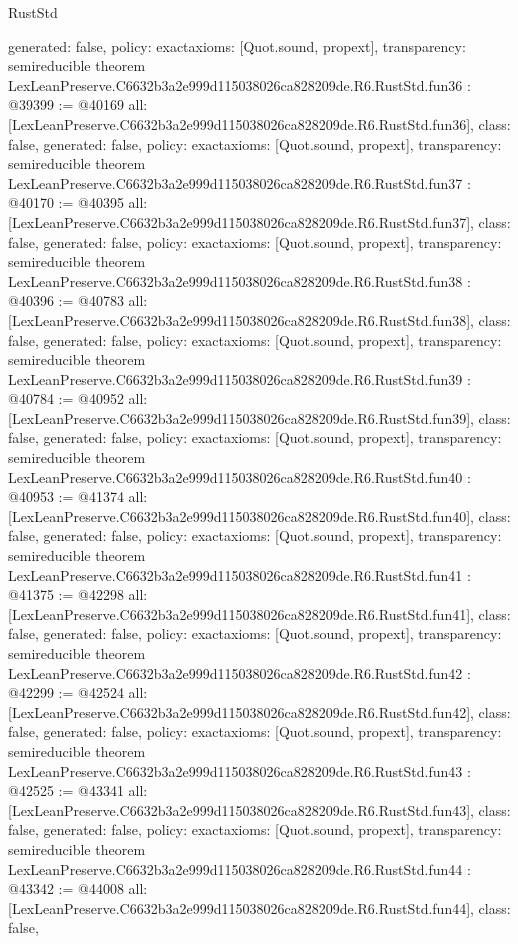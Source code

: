 \begin{lexlean}{RustStd}
\begin{coremodule}
{  generated: false,
  policy: exact{axioms: [Quot.sound, propext]},
  transparency: semireducible
}
theorem LexLeanPreserve.C6632b3a2e999d115038026ca828209de.R6.RustStd.fun36 : @39399 := @40169 {
  all: [LexLeanPreserve.C6632b3a2e999d115038026ca828209de.R6.RustStd.fun36],
  class: false,
  generated: false,
  policy: exact{axioms: [Quot.sound, propext]},
  transparency: semireducible
}
theorem LexLeanPreserve.C6632b3a2e999d115038026ca828209de.R6.RustStd.fun37 : @40170 := @40395 {
  all: [LexLeanPreserve.C6632b3a2e999d115038026ca828209de.R6.RustStd.fun37],
  class: false,
  generated: false,
  policy: exact{axioms: [Quot.sound, propext]},
  transparency: semireducible
}
theorem LexLeanPreserve.C6632b3a2e999d115038026ca828209de.R6.RustStd.fun38 : @40396 := @40783 {
  all: [LexLeanPreserve.C6632b3a2e999d115038026ca828209de.R6.RustStd.fun38],
  class: false,
  generated: false,
  policy: exact{axioms: [Quot.sound, propext]},
  transparency: semireducible
}
theorem LexLeanPreserve.C6632b3a2e999d115038026ca828209de.R6.RustStd.fun39 : @40784 := @40952 {
  all: [LexLeanPreserve.C6632b3a2e999d115038026ca828209de.R6.RustStd.fun39],
  class: false,
  generated: false,
  policy: exact{axioms: [Quot.sound, propext]},
  transparency: semireducible
}
theorem LexLeanPreserve.C6632b3a2e999d115038026ca828209de.R6.RustStd.fun40 : @40953 := @41374 {
  all: [LexLeanPreserve.C6632b3a2e999d115038026ca828209de.R6.RustStd.fun40],
  class: false,
  generated: false,
  policy: exact{axioms: [Quot.sound, propext]},
  transparency: semireducible
}
theorem LexLeanPreserve.C6632b3a2e999d115038026ca828209de.R6.RustStd.fun41 : @41375 := @42298 {
  all: [LexLeanPreserve.C6632b3a2e999d115038026ca828209de.R6.RustStd.fun41],
  class: false,
  generated: false,
  policy: exact{axioms: [Quot.sound, propext]},
  transparency: semireducible
}
theorem LexLeanPreserve.C6632b3a2e999d115038026ca828209de.R6.RustStd.fun42 : @42299 := @42524 {
  all: [LexLeanPreserve.C6632b3a2e999d115038026ca828209de.R6.RustStd.fun42],
  class: false,
  generated: false,
  policy: exact{axioms: [Quot.sound, propext]},
  transparency: semireducible
}
theorem LexLeanPreserve.C6632b3a2e999d115038026ca828209de.R6.RustStd.fun43 : @42525 := @43341 {
  all: [LexLeanPreserve.C6632b3a2e999d115038026ca828209de.R6.RustStd.fun43],
  class: false,
  generated: false,
  policy: exact{axioms: [Quot.sound, propext]},
  transparency: semireducible
}
theorem LexLeanPreserve.C6632b3a2e999d115038026ca828209de.R6.RustStd.fun44 : @43342 := @44008 {
  all: [LexLeanPreserve.C6632b3a2e999d115038026ca828209de.R6.RustStd.fun44],
  class: false,
}
\end{coremodule}
\end{lexlean}
